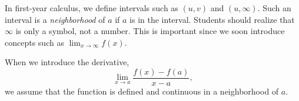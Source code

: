 \documentclass{article}
\begin{document}
 
In first-year calculus, we   define intervals  such as 
$(u, v)$ and $(u, \infty)$.  Such an interval is a 
\emph{neighborhood} of  $a$
if  $a$ is in the interval.  Students should 
realize that  $\infty$ is only a
symbol, not a number.  This is important since 
we soon introduce concepts
 such as $\lim_{x \to \infty} f(x)$.  

When we introduce the derivative,
\[
   \lim_{x \to a} \frac{f(x) - f(a)}{x - a},
\]
we assume that the function is defined and continuous 
in a neighborhood of  $a$.
\end{document}
